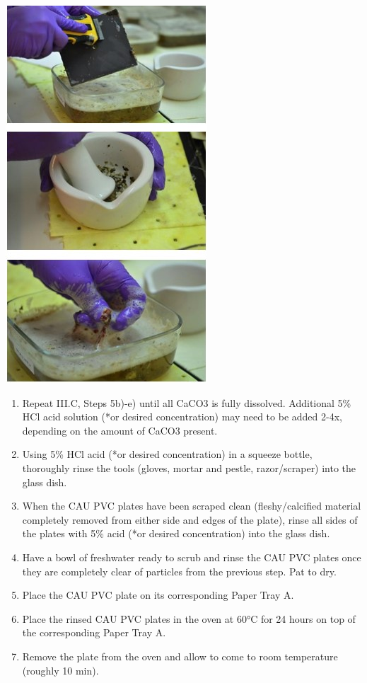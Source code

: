 \documentclass[]{book}
\begin{document}
\includegraphics{images/CAU_dissolve.jpg}

\begin{enumerate}
\def\labelenumi{\arabic{enumi}.}
\setcounter{enumi}{5}
\item
  Repeat III.C, Steps 5b)-e) until all CaCO3 is fully dissolved. Additional 5\% HCl acid solution (*or desired concentration) may need to be added 2-4x, depending on the amount of CaCO3 present.
\item
  Using 5\% HCl acid (*or desired concentration) in a squeeze bottle, thoroughly rinse the tools (gloves, mortar and pestle, razor/scraper) into the glass dish.
\item
  When the CAU PVC plates have been scraped clean (fleshy/calcified material completely removed from either side and edges of the plate), rinse all sides of the plates with 5\% acid (*or desired concentration) into the glass dish.
\item
  Have a bowl of freshwater ready to scrub and rinse the CAU PVC plates once they are completely clear of particles from the previous step. Pat to dry.
\item
  Place the CAU PVC plate on its corresponding Paper Tray A.
\item
  Place the rinsed CAU PVC plates in the oven at 60°C for 24 hours on top of the corresponding Paper Tray A.
\item
  Remove the plate from the oven and allow to come to room temperature (roughly 10 min).
\end{enumerate}
\end{document}
